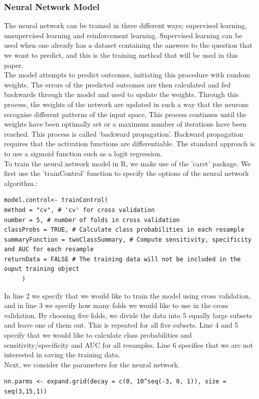      \subsubsection{Neural Network Model}
        \noindent The neural network can be trained in three different ways; supervised learning, unsupervised learning and reinforcement learning. Supervised learning can be used when one already has a dataset containing the answers to the question that we want to predict, and this is the training method that will be used in this paper.\\
        [\baselineskip]\indent The model attempts to predict outcomes, initiating this procedure with random weights. The errors of the predicted outcomes are then calculated and fed backwards through the model and used to update the weights. Through this process, the weights of the network are updated in such a way that the neurons recognise different patterns of the input space. This process continues until the weights have been optimally set or a maximum number of iterations have been reached. This process is called ‘backward propagation’. Backward propagation requires that the activation functions are differentiable. The standard approach is to use a sigmoid function such as a logit regression.\\
     [\baselineskip]\indent To train the neural network model in R, we make use of the 'caret' package. We first use the 'trainControl' function to specify the options of the neural network algorithm.:
     \begin{lstlisting}
model.control<- trainControl(
method = "cv", # 'cv' for cross validation
number = 5, # number of folds in cross validation
classProbs = TRUE, # Calculate class probabilities in each resample
summaryFunction = twoClassSummary, # Compute sensitivity, specificity and AUC for each resample
returnData = FALSE # The training data will not be included in the ouput training object
     )
     \end{lstlisting}
     \indent In line 2 we specify that we would like to train the model using cross validation, and in line 3 we specify how many folds we would like to use in the cross validation. By choosing five folds, we divide the data into 5 equally large subsets and leave one of them out. This is repeated for all five subsets. Line 4 and 5 specify that we would like to calculate class probabilities and sensitivity/specificity and AUC for all resamples. Line 6 specifies that we are not interested in saving the training data.\\
     Next, we consider the parameters for the neural network.
     \begin{lstlisting}
nn.parms <- expand.grid(decay = c(0, 10^seq(-3, 0, 1)), size = seq(3,15,1))
     \end{lstlisting}
     
